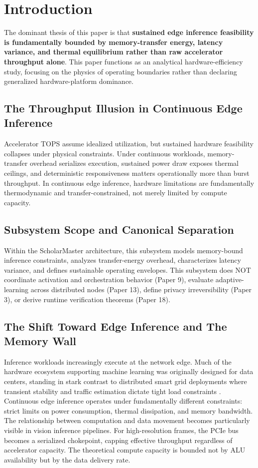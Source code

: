 \documentclass[conference]{IEEEtran}
\begin{document}
\section{Introduction}

The dominant thesis of this paper is that \textbf{sustained edge inference feasibility is fundamentally bounded by memory-transfer energy, latency variance, and thermal equilibrium rather than raw accelerator throughput alone}. This paper functions as an analytical hardware-efficiency study, focusing on the physics of operating boundaries rather than declaring generalized hardware-platform dominance.

\subsection{The Throughput Illusion in Continuous Edge Inference}
Accelerator TOPS assume idealized utilization, but sustained hardware feasibility collapses under physical constraints. Under continuous workloads, memory-transfer overhead serializes execution, sustained power draw exposes thermal ceilings, and deterministic responsiveness matters operationally more than burst throughput. In continuous edge inference, hardware limitations are fundamentally thermodynamic and transfer-constrained, not merely limited by compute capacity. 

\subsection{Subsystem Scope and Canonical Separation}
Within the ScholarMaster architecture, this subsystem models memory-bound inference constraints, analyzes transfer-energy overhead, characterizes latency variance, and defines sustainable operating envelopes. This subsystem does NOT coordinate activation and orchestration behavior (Paper 9), evaluate adaptive-learning across distributed nodes (Paper 13), define privacy irreversibility (Paper 3), or derive runtime verification theorems (Paper 18).

\subsection{The Shift Toward Edge Inference and The Memory Wall}
Inference workloads increasingly execute at the network edge. Much of the hardware ecosystem supporting machine learning was originally designed for data centers, standing in stark contrast to distributed smart grid deployments where transient stability and traffic estimation dictate tight load constraints \cite{b_smartgrid_2016, b_ipfc_2013}. Continuous edge inference operates under fundamentally different constraints: strict limits on power consumption, thermal dissipation, and memory bandwidth. The relationship between computation and data movement becomes particularly visible in vision inference pipelines. For high-resolution frames, the PCIe bus becomes a serialized chokepoint, capping effective throughput regardless of accelerator capacity. The theoretical compute capacity is bounded not by ALU availability but by the data delivery rate.
\end{document}
